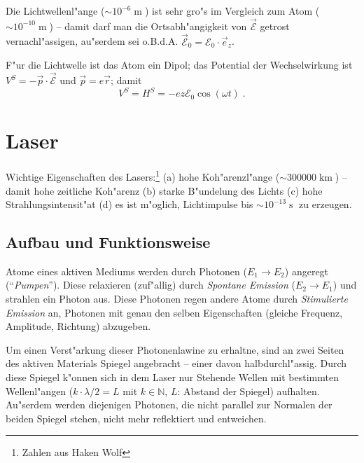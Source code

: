 \documentclass[a4paper,draft]{article}
\begin{document}
Die Lichtwellenl"ange ($\sim 10^{-6}\operatorname{m}$) ist sehr gro"s
im Vergleich zum Atom ($\sim 10^{-10}\operatorname{m}$) -- damit darf
man die Ortsabh"angigkeit von $\vec{\mathcal E}$ getrost
vernachl"assigen, au"serdem sei o.B.d.A. $\vec {\mathcal E}_0 =
\mathcal E_0 \cdot \vec e_z$.

F"ur die Lichtwelle ist das Atom ein Dipol; das Potential der
Wechselwirkung ist $V^S = - \vec p \cdot \vec {\mathcal E}$ und $\vec
p = e \vec r$; damit
\begin{equation}
  \label{eq:11}
  V^S = H^S = - e z \mathcal E_0 \cos(\omega t) \;.
\end{equation}









\section{Laser}
\label{sec:laser}


Wichtige Eigenschaften des Lasers:\footnote{Zahlen aus Haken Wolf} (a)
hohe Koh"arenzl"ange ($\sim 300 000\operatorname{km}$) -- damit hohe
zeitliche Koh"arenz (b) starke B"undelung des Lichts (c) hohe
Strahlungsintensit"at (d) es ist m"oglich, Lichtimpulse bis $\sim
10^{-13}\operatorname{s}$ zu erzeugen.






\subsection{Aufbau und Funktionsweise}
\label{sec:aufbau_und_funktionsweise}



Atome eines aktiven Mediums werden durch Photonen ($E_1 \to E_2$) angeregt
("`\emph{Pumpen}"').  Diese relaxieren (zuf"allig) durch
\emph{Spontane Emission} ($E_2 \to E_1$) und strahlen ein Photon aus.
Diese Photonen regen andere Atome durch \emph{Stimulierte Emission}
an, Photonen mit genau den selben Eigenschaften (gleiche Frequenz,
Amplitude, Richtung) abzugeben.

Um einen Verst"arkung dieser Photonenlawine zu erhaltne, sind an zwei
Seiten des aktiven Materials Spiegel angebracht -- einer davon
halbdurchl"assig. Durch diese Spiegel k"onnen sich in dem Laser nur
Stehende Wellen mit bestimmten Wellenl"angen ($k \cdot \lambda/2 = L$
mit $k \in \mathbb N$, $L$: Abstand der Spiegel) aufhalten. Au"serdem
werden diejenigen Photonen, die nicht parallel zur Normalen der beiden
Spiegel stehen, nicht mehr reflektiert und entweichen.
\end{document}
